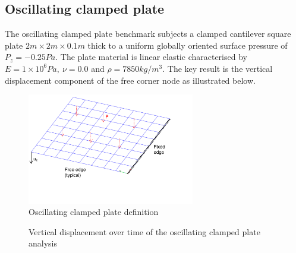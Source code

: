 \subsection{Oscillating clamped plate}

The oscillating clamped plate benchmark subjects a clamped cantilever square plate $2m\times2m\times0.1m$ thick to a uniform globally oriented surface pressure of $P_z = -0.25 Pa$. The plate material is linear elastic characterised by $E = 1\times 10^6 Pa,\ \nu = 0.0$ and $\rho = 7850 kg/m^3$. The key result is the vertical displacement component of the free corner node as illustrated below.

\begin{figure}[H]
	\centering
	\def\svgwidth{\columnwidth}
	\includegraphics[width=7.3cm]{images/quad_bend_problem.png}
	\caption{Oscillating clamped plate definition}
\end{figure}
\begin{figure}[H]
	\caption{\label{ref_label_overall}Vertical displacement over time of the oscillating clamped plate analysis}
\end{figure}

